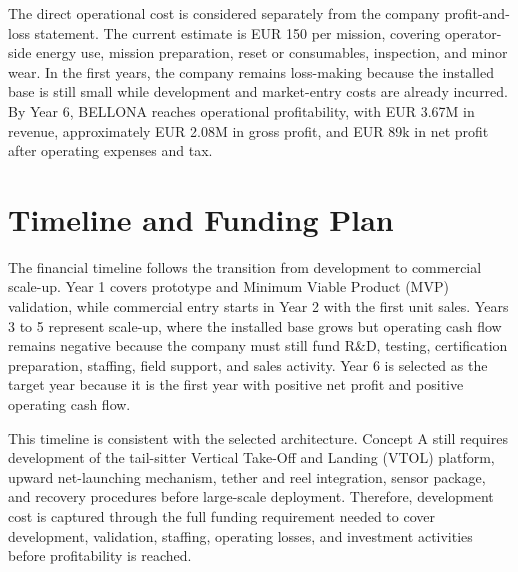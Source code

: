 The direct operational cost is considered separately from the company profit-and-loss statement. The current estimate is EUR 150 per mission, covering operator-side energy use, mission preparation, reset or consumables, inspection, and minor wear.  In the first years, the company remains loss-making because the installed base is still small while development and market-entry costs are already incurred. By Year 6, BELLONA reaches operational profitability, with EUR 3.67M in revenue, approximately EUR 2.08M in gross profit, and EUR 89k in net profit after operating expenses and tax.


\section{Timeline and Funding Plan}

The financial timeline follows the transition from development to commercial scale-up. Year 1 covers prototype and Minimum Viable Product (MVP) validation, while commercial entry starts in Year 2 with the first unit sales. Years 3 to 5 represent scale-up, where the installed base grows but operating cash flow remains negative because the company must still fund R\&D, testing, certification preparation, staffing, field support, and sales activity. Year 6 is selected as the target year because it is the first year with positive net profit and positive operating cash flow.

This timeline is consistent with the selected architecture. Concept A still requires development of the tail-sitter Vertical Take-Off and Landing (VTOL) platform, upward net-launching mechanism, tether and reel integration, sensor package, and recovery procedures before large-scale deployment. Therefore, development cost is captured through the full funding requirement needed to cover development, validation, staffing, operating losses, and investment activities before profitability is reached.

